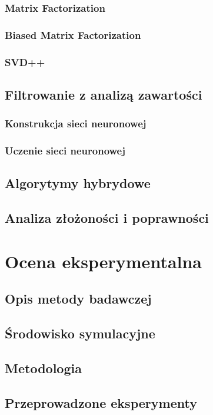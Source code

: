 \documentclass[twoside]{iisthesis}
\begin{document}
		 \subsection{Matrix Factorization}
		 \subsection{Biased Matrix Factorization}
		 \subsection{SVD++}
	 \section{Filtrowanie z analizą zawartości}
		 \subsection{Konstrukcja sieci neuronowej}
		 \subsection{Uczenie sieci neuronowej}
	 \section{Algorytymy hybrydowe}
	 \section{Analiza złożoności i poprawności}
 
\chapter{Ocena eksperymentalna}
	\section{Opis metody badawczej}
	\section{Środowisko symulacyjne}
	\section{Metodologia}
	\section{Przeprowadzone eksperymenty}
	
\end{document}
